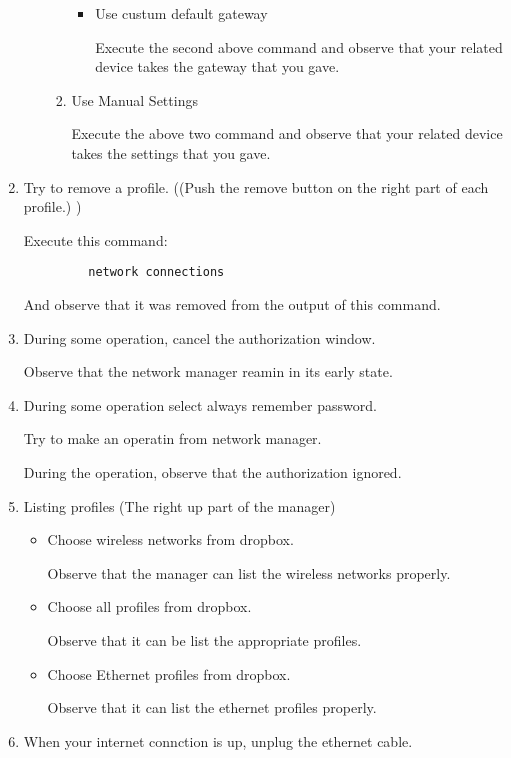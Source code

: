 \documentclass[a4paper,10pt]{article}
\begin{document}
\begin{enumerate}
\begin{enumerate}
\begin{enumerate}
\begin{itemize}
		  \item Use custum default gateway
		     
		      Execute the second above command and observe that your related device takes the gateway that you gave.
		\end{itemize}
	      \item Use Manual Settings
		    
		      Execute the above two command and observe that your related device takes the settings that you gave. 
	    \end{enumerate}
	
      \end{enumerate}
      \item Try to remove a profile. ((Push the remove button on the right part of each profile.) )
      
	    Execute this command:
	    \begin{verbatim}
	     network connections
	    \end{verbatim}
	    And observe that it was removed from the output of this command.

	\item During some operation, cancel the authorization window.

	Observe that the network manager reamin in its early state.

	\item During some operation select always remember password.
	
	Try to make an operatin from network manager.
	
 	During the operation, observe that the authorization ignored.

	\item Listing profiles (The right up part of the manager)
	\begin{itemize}
	 \item Choose wireless networks from dropbox.
	
	 Observe that the manager can list the wireless networks properly.
	
 	\item Choose all profiles from dropbox.
	
	Observe that it can be list the appropriate profiles.
	
	\item Choose Ethernet profiles from dropbox.
	
    Observe that it can list the ethernet profiles properly.
	
	\end{itemize}
	\item When your internet connction is up, unplug the ethernet cable.


\end{enumerate}
\end{document}
